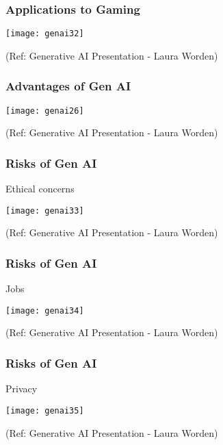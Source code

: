 \begin{frame}[fragile]\frametitle{Applications to Gaming}

\begin{center}
\texttt{[image: genai32]}
\end{center}


{\tiny (Ref: Generative AI Presentation  - Laura Worden)}

\end{frame}



\begin{frame}[fragile]\frametitle{Advantages of Gen AI}

\begin{center}
\texttt{[image: genai26]}
\end{center}


{\tiny (Ref: Generative AI Presentation  - Laura Worden)}

\end{frame}

\begin{frame}[fragile]\frametitle{Risks of Gen AI}
Ethical concerns

\begin{center}
\texttt{[image: genai33]}
\end{center}


{\tiny (Ref: Generative AI Presentation  - Laura Worden)}

\end{frame}

\begin{frame}[fragile]\frametitle{Risks of Gen AI}
Jobs

\begin{center}
\texttt{[image: genai34]}
\end{center}


{\tiny (Ref: Generative AI Presentation  - Laura Worden)}

\end{frame}

\begin{frame}[fragile]\frametitle{Risks of Gen AI}

Privacy

\begin{center}
\texttt{[image: genai35]}
\end{center}


{\tiny (Ref: Generative AI Presentation  - Laura Worden)}

\end{frame}

